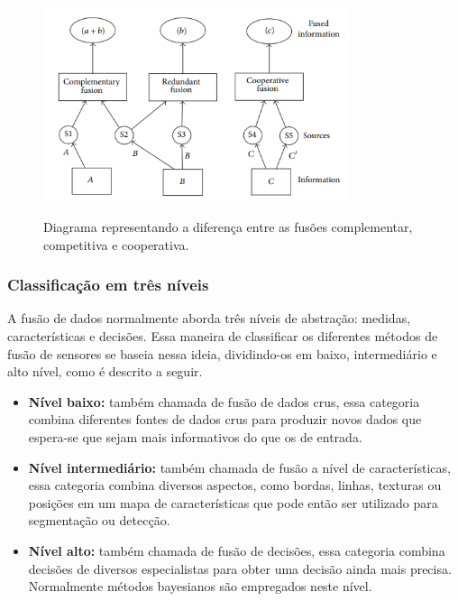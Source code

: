 \documentclass[acronym, symbols]{fei}
\begin{document}
				\begin{figure}[!htb]
					\centering
					\caption{Diagrama representando a diferença entre as fusões complementar, competitiva e cooperativa.} 
					\includegraphics[width=0.8\textwidth]{classificacao_fusao_de_sensores.png}
					\label{fig:classificacao_fusao_de_sensores}
				\end{figure}
			
			\subsubsection{Classificação em três níveis}
			
				A fusão de dados normalmente aborda três níveis de abstração: medidas, características e decisões. Essa maneira de classificar os diferentes métodos de fusão de sensores se baseia nessa ideia, dividindo-os em baixo, intermediário e alto nível, como é descrito a seguir.
			
				\begin{itemize}
					\item \textbf{Nível baixo:} também chamada de fusão de dados crus, essa categoria combina diferentes fontes de dados crus para produzir novos dados que espera-se que sejam mais informativos do que os de entrada.
					
					\item \textbf{Nível intermediário:} também chamada de fusão a nível de características, essa categoria combina diversos aspectos, como bordas, linhas, texturas ou posições em um mapa de características que pode então ser utilizado para segmentação ou detecção.
					
					\item \textbf{Nível alto:} também chamada de fusão de decisões, essa categoria combina decisões de diversos especialistas para obter uma decisão ainda mais precisa. Normalmente métodos bayesianos são empregados neste nível.
				\end{itemize}
			
\end{document}
